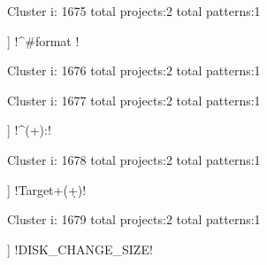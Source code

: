 Cluster i: 1675
total projects:2
total patterns:1
\begin{multicols}{1}
\begin{description}[noitemsep,topsep=0pt]
\item [[2] ] \cverb!^#format \w*\n!
\end{description}
\end{multicols}







Cluster i: 1676
total projects:2
total patterns:1
\begin{multicols}{1}
\end{multicols}







Cluster i: 1677
total projects:2
total patterns:1
\begin{multicols}{1}
\begin{description}[noitemsep,topsep=0pt]
\item [[2] ] \cverb!^\s*(\w+)\s*:!
\end{description}
\end{multicols}







Cluster i: 1678
total projects:2
total patterns:1
\begin{multicols}{1}
\begin{description}[noitemsep,topsep=0pt]
\item [[2] ] \cverb!Target\s+(\d+)!
\end{description}
\end{multicols}







Cluster i: 1679
total projects:2
total patterns:1
\begin{multicols}{1}
\begin{description}[noitemsep,topsep=0pt]
\item [[2] ] \cverb!DISK_CHANGE_SIZE!
\end{description}
\end{multicols}








